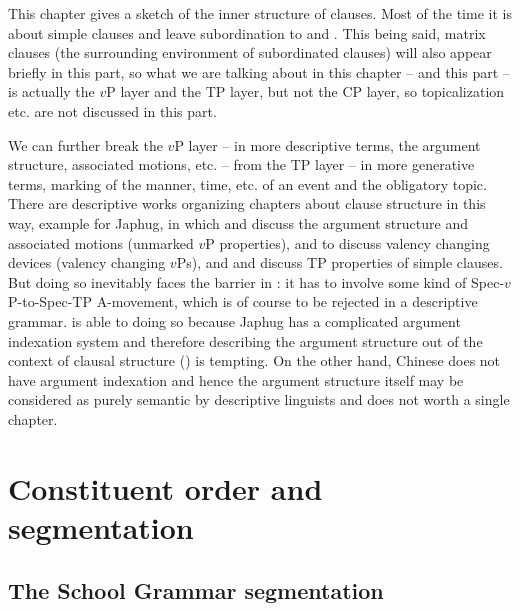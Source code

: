 \documentclass[../main.tex]{subfiles}
\begin{document}
This chapter gives a sketch of the inner structure of clauses.
Most of the time it is about simple clauses and leave subordination to 
 and .
This being said, matrix clauses (the surrounding environment of subordinated clauses)
will also appear briefly in this part, so what we are talking about in this chapter -- and this part -- is 
actually the $v$P layer and the TP layer, but not the CP layer, so topicalization etc. are not 
discussed in this part. 

We can further break the $v$P layer -- 
in more descriptive terms, the argument structure, associated motions, etc.
-- from the TP layer -- 
in more generative terms, marking of the manner, time, etc. of an event and the obligatory topic. 
There are descriptive works organizing chapters about clause structure in this way, 
example \citet{jacques2021grammar} for Japhug, 
in which  and  discuss the argument structure 
and associated motions (unmarked $v$P properties), 
and  to  discuss valency changing devices (valency changing $v$Ps), 
and  and  discuss TP properties of simple clauses. 
But doing so inevitably faces the barrier in : 
it has to involve some kind of Spec-$v$P-to-Spec-TP A-movement, 
which is of course to be rejected in a descriptive grammar. 
\citet{jacques2021grammar} is able to doing so 
because Japhug has a complicated argument indexation system 
and therefore describing the argument structure out of the context of clausal structure () is tempting.
On the other hand, Chinese does not have argument indexation and hence 
the argument structure itself may be considered as purely semantic by descriptive linguists
and does not worth a single chapter.

\section{Constituent order and segmentation}\label{sec:clause-constituent-order-overview}

\subsection{The School Grammar segmentation}
\end{document}
